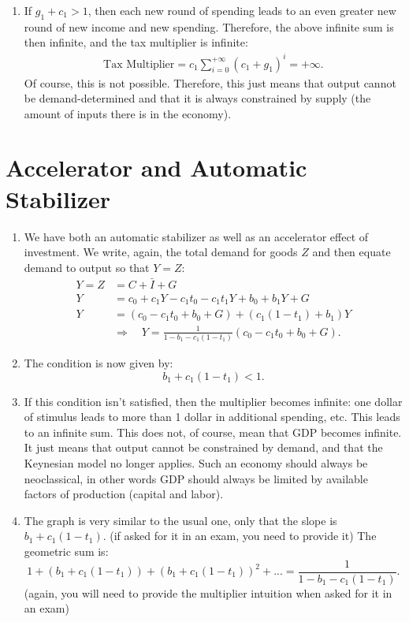 \documentclass[]{book}
\providecommand{\tightlist}{%
  \setlength{\itemsep}{0pt}\setlength{\parskip}{0pt}}
\theoremstyle{definition}
\theoremstyle{definition}
\theoremstyle{definition}
\theoremstyle{remark}
\begin{document}
\begin{enumerate}
\def\labelenumi{\arabic{enumi}.}
\setcounter{enumi}{4}
\tightlist
\item
  If \(g_1+c_1>1\), then each new round of spending leads to an even
  greater new round of new income and new spending. Therefore, the above
  infinite sum is then infinite, and the tax multiplier is infinite: \[
  \begin{aligned}
  \text{Tax Multiplier} =c_1 \sum_{i=0}^{+\infty}(c_1+g_1)^i = +\infty.
  \end{aligned}
  \] Of course, this is not possible. Therefore, this just means that
  output cannot be demand-determined and that it is always constrained
  by supply (the amount of inputs there is in the economy).
\end{enumerate}

\section*{Accelerator and Automatic
Stabilizer}\label{accelerator-and-automatic-stabilizer-1}

\begin{enumerate}
\def\labelenumi{\arabic{enumi}.}
\item
  We have both an automatic stabilizer as well as an accelerator effect
  of investment. We write, again, the total demand for goods \(Z\) and
  then equate demand to output so that \(Y=Z\): \[
  \begin{aligned}
  Y=Z &=C+\bar{I}+G\\
  Y   &=c_{0}+c_{1} Y - c_1 t_0 - c_1 t_1 Y+ b_0+ b_{1}Y + G\\
  Y   &=\left(c_{0}-c_{1}t_0+b_{0}+G\right)+\left(c_{1}(1-t_1)+b_1\right)Y \\
  & \Rightarrow \quad \boxed{Y=\frac{1}{1-b_{1}-c_{1}(1-t_1)}\left(c_{0}-c_{1}t_0+b_{0}+G\right)}.
  \end{aligned}
  \]
\item
  The condition is now given by: \[b_1 + c_1(1-t_1)<1.\]
\item
  If this condition isn't satisfied, then the multiplier becomes
  infinite: one dollar of stimulus leads to more than 1 dollar in
  additional spending, etc. This leads to an infinite sum. This does
  not, of course, mean that GDP becomes infinite. It just means that
  output cannot be constrained by demand, and that the Keynesian model
  no longer applies. Such an economy should always be neoclassical, in
  other words GDP should always be limited by available factors of
  production (capital and labor).
\item
  The graph is very similar to the usual one, only that the slope is
  \(b_1+c_1(1-t_1)\). (if asked for it in an exam, you need to provide
  it) The geometric sum is:
  \[1+ \left(b_1+c_1(1-t_1)\right) + \left(b_1+c_1(1-t_1)\right)^2 + ... = \frac{1}{1-b_1-c_1(1-t_1)}.\]
  (again, you will need to provide the multiplier intuition when asked
  for it in an exam)
\end{enumerate}
\end{document}
